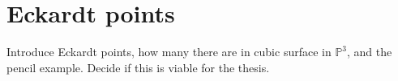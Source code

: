 \section{Eckardt points}

Introduce Eckardt points, how many there are in cubic surface in $\mathbb{P}^3$, and the pencil example. Decide if this is viable for the thesis. 